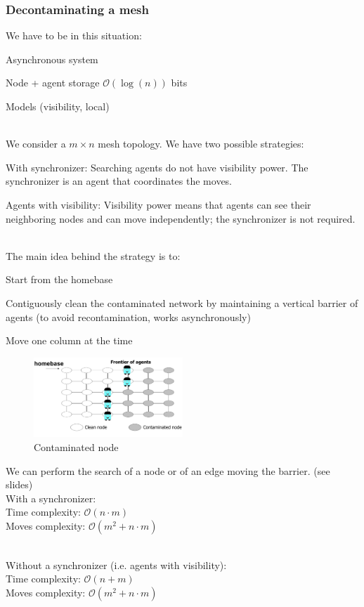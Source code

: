 \documentclass[paper=a4, fontsize=11pt]{scrartcl} %
\numberwithin{equation}{section} %
\numberwithin{figure}{section} %
\numberwithin{table}{section} %
\begin{document}
\subsubsection*{Decontaminating a mesh}
We have to be in this situation: 
\begin{compactitem}
\item Asynchronous system
\item Node + agent storage $\mathcal{O}(\log(n))$ bits
\item Models (visibility, local)
\end{compactitem}
~ \\ 
We consider a $m \times n$ mesh topology. We have two possible strategies:
\begin{compactenum}
\item With synchronizer: Searching agents do not have visibility power. The synchronizer is an agent that coordinates the moves.
\item Agents with visibility: Visibility power means that agents can see their neighboring nodes and can move independently; the synchronizer is not required.
\end{compactenum}
~ \\ 
The main idea behind the strategy is to: 
\begin{compactenum}
\item Start from the homebase
\item Contiguously clean the contaminated network by maintaining a vertical barrier of agents (to avoid recontamination, works asynchronously)
\item Move one column at the time
\end{compactenum}
\begin{figure}[H]
  \centering
  \includegraphics[width=0.5\textwidth]{img/cont_front.png}
  \caption{Contaminated node}
  
\end{figure}
We can perform the search of a node or of an edge moving the barrier. (see slides)
\\
With a synchronizer: \\
Time complexity: $\mathcal{O}(n\cdot m)$ \\
Moves complexity: $\mathcal{O}(m^2 + n\cdot m)$

~ \\
Without a synchronizer (i.e. agents with visibility): \\
Time complexity: $\mathcal{O}(n + m)$ \\ 
Moves complexity: $\mathcal{O}(m^2 + n\cdot m)$
\end{document}
